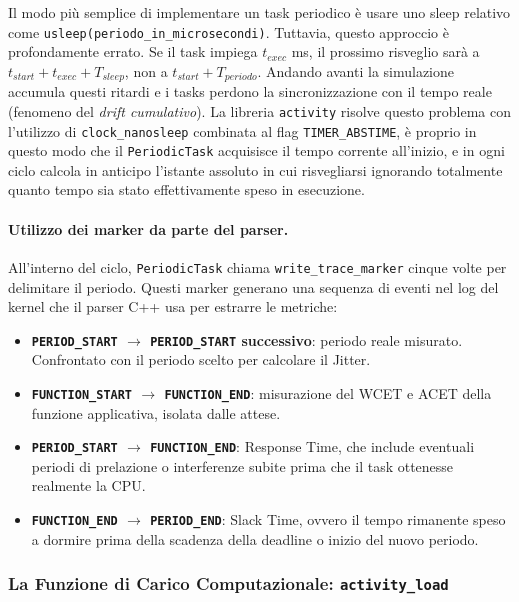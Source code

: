 Il modo più semplice di implementare un task periodico è usare uno sleep relativo come \texttt{usleep(periodo\_in\_microsecondi)}. Tuttavia, questo approccio è profondamente errato. Se il task impiega $t_{exec}$ ms, il prossimo risveglio sarà a $t_{start} + t_{exec} + T_{sleep}$, non a $t_{start} + T_{periodo}$. Andando avanti la simulazione accumula questi ritardi e i tasks perdono la sincronizzazione con il tempo reale (fenomeno del \textit{drift cumulativo}). 
La libreria \texttt{activity} risolve questo problema con l'utilizzo di \texttt{clock\_nanosleep} combinata al flag \texttt{TIMER\_ABSTIME}, è proprio in questo modo che il \texttt{PeriodicTask} acquisisce il tempo corrente all'inizio, e in ogni ciclo calcola in anticipo l'istante assoluto in cui risvegliarsi ignorando totalmente quanto tempo sia stato effettivamente speso in esecuzione. 

\paragraph{Utilizzo dei marker da parte del parser.} All'interno del ciclo, \texttt{PeriodicTask} chiama \texttt{write\_trace\_marker} cinque volte per delimitare il periodo. Questi marker generano una sequenza di eventi nel log del kernel che il parser C++ usa per estrarre le metriche:
\begin{itemize}
	\item \textbf{\texttt{PERIOD\_START} $\to$ \texttt{PERIOD\_START} successivo}: periodo reale misurato. Confrontato con il periodo scelto per calcolare il Jitter.
	\item \textbf{\texttt{FUNCTION\_START} $\to$ \texttt{FUNCTION\_END}}: misurazione del WCET e ACET della funzione applicativa, isolata dalle attese.
	\item \textbf{\texttt{PERIOD\_START} $\to$ \texttt{FUNCTION\_END}}: Response Time, che include eventuali periodi di prelazione o interferenze subite prima che il task ottenesse realmente la CPU.
	\item \textbf{\texttt{FUNCTION\_END} $\to$ \texttt{PERIOD\_END}}: Slack Time, ovvero il tempo rimanente speso a dormire prima della scadenza della deadline o inizio del nuovo periodo.
\end{itemize}

\subsubsection{La Funzione di Carico Computazionale: \texttt{activity\_load}}

